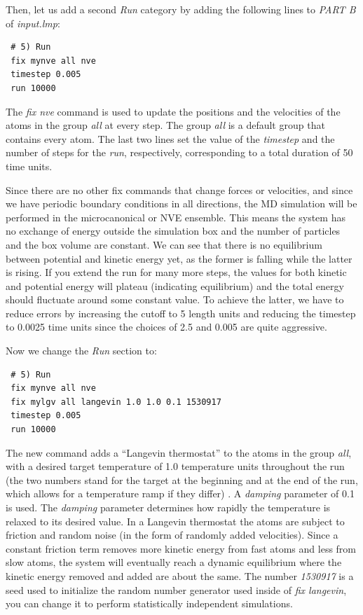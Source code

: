 \documentclass[9pt,tutorial]{livecoms}
\begin{document}
Then, let us add a second \textit{Run} category by adding the following
lines to \textit{PART B} of \textit{input.lmp}:
{\normalsize
\begin{verbatim}
 # 5) Run
 fix mynve all nve
 timestep 0.005
 run 10000
\end{verbatim}
}
The \textit{fix nve} command is used to update the positions and the
velocities of the atoms in the group \textit{all} at every step.  The
group \textit{all} is a default group that contains every atom.  The
last two lines set the value of the \textit{timestep} and the number of
steps for the \textit{run}, respectively, corresponding to a total
duration of 50 time units.

Since there are no other fix commands that change forces or velocities,
and since we have periodic boundary conditions in all directions, the MD
simulation will be performed in the microcanonical or NVE ensemble.
This means the system has no exchange of energy outside the simulation
box and the number of particles and the box volume are constant.  We can
see that there is no equilibrium between potential and kinetic energy
yet, as the former is falling while the latter is rising.  If you extend
the run for many more steps, the values for both kinetic and
potential energy will plateau (indicating equilibrium) and the total
energy should fluctuate around some constant value.  To achieve the
latter, we have to reduce errors by increasing the cutoff to 5 length
units and reducing the timestep to 0.0025 time units since the choices
of 2.5 and 0.005 are quite aggressive.

Now we change the \textit{Run} section to:
{\normalsize
\begin{verbatim}
 # 5) Run
 fix mynve all nve
 fix mylgv all langevin 1.0 1.0 0.1 1530917
 timestep 0.005
 run 10000
\end{verbatim}
}

The new command adds a ``Langevin thermostat'' to the atoms in the group
\textit{all}, with a desired target temperature of 1.0 temperature units
throughout the run (the two numbers stand for the target at the beginning
and at the end of the run, which allows for a temperature ramp if
they differ) \cite{schneider1978molecular}.  A \textit{damping}
parameter of 0.1 is used.  The \textit{damping} parameter determines how
rapidly the temperature is relaxed to its desired value.  In a Langevin
thermostat the atoms are subject to friction and random noise (in the form
of randomly added velocities).  Since a constant friction term removes
more kinetic energy from fast atoms and less from slow atoms, the system
will eventually reach a dynamic equilibrium where the kinetic energy
removed and added are about the same.  The number \textit{1530917} is a
seed used to initialize the random number generator used inside of
\textit{fix langevin}, you can change it to perform statistically
independent simulations.
\end{document}
